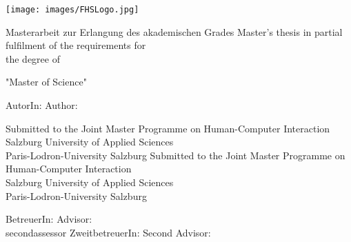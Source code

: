 \begin{titlepage}

\newcommand{\printsecondassessor}[1]{%
  \ifcsname#1\endcsname%
  \ifhcilanguagegerman ZweitbetreuerIn: \else Second Advisor: \fi \secondassessor 
  \else%
    
  \fi%
}

\ifhcimasterthesis

    
    
    \newpage
    
    \thispagestyle{empty}
    
    \hfill \texttt{[image: images/FHSLogo.jpg]}
    
    \vspace*{2cm}
    \Large{
    
    \titlename
     
    \vspace*{1cm}
    
    \ifhcilanguagegerman
    Masterarbeit zur Erlangung des akademischen Grades
    \else
    Master's thesis in partial fulfilment of the requirements for\\ the degree of 
    \fi
    
    \vspace*{0.5cm}
    
    {"Master of Science"}
    }
    
    
    \vspace*{1.5cm}
    {\large
    \ifhcilanguagegerman AutorIn: \else Author: \fi \authorname
    }
    \vfill
    
    {\normalsize
    \ifhcilanguagegerman
    Submitted to the Joint Master Programme on Human-Computer Interaction
    \\Salzburg University of Applied Sciences
    \\Paris-Lodron-University Salzburg
    \else
    Submitted to the Joint Master Programme on Human-Computer Interaction
    \\Salzburg University of Applied Sciences
    \\Paris-Lodron-University Salzburg
    \fi
    
    
    \vspace*{1cm}
    
    \ifhcilanguagegerman BetreuerIn: \else Advisor: \fi
    \supervisor
    \\    
    \printsecondassessor{secondassessor}
    
}
\end{titlepage}
